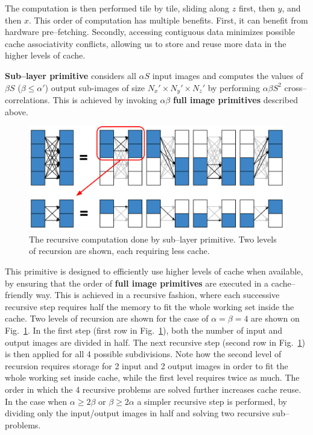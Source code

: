   The computation is then performed tile by tile, sliding along $z$
  first, then $y$, and then $x$.  This order of computation has
  multiple benefits.  First, it can benefit from hardware
  pre--fetching.  Secondly, accessing contiguous data minimizes
  possible cache associativity conflicts, allowing us to store and reuse more
  data in the higher levels of cache.

  {\bf Sub--layer primitive} considers all $\alpha S$ input images and
  computes the values of $\beta S$ ($\beta \le \alpha'$) output
  sub-images of size $N_x' \times N_y' \times N_z'$ by performing
  $\alpha \beta S^2$ cross--correlations.  This is achieved by invoking
  $\alpha \beta$ {\bf full image primitives} described above.

  \begin{figure}
    \begin{center}
      \includegraphics[width=0.8\linewidth]{fig/serialexec}
    \end{center}
    \caption{The recursive computation done by sub--layer primitive.
      Two levels of recursion are shown, each requiring less cache. }
    \label{fig:full-exec}
  \end{figure}

  This primitive is designed to efficiently use higher levels of cache
  when available, by ensuring that the order of {\bf full image
    primitives} are executed in a cache--friendly way.  This is
  achieved in a recursive fashion, where each successive recursive
  step requires half the memory to fit the whole working set inside
  the cache.  Two levels of recursion are shown for the case of
  $\alpha = \beta = 4$ are shown on Fig.~\ref{fig:full-exec}.  In the
  first step (first row in Fig.~\ref{fig:full-exec}), both the number
  of input and output images are divided in half.  The next recursive
  step (second row in Fig.~\ref{fig:full-exec}) is then applied for
  all 4 possible subdivisions.  Note how the second level of recursion
  requires storage for 2 input and 2 output images in order to fit the
  whole working set inside cache, while the first level requires twice
  as much.  The order in which the 4 recursive problems are solved
  further increases cache reuse.  In the case when $\alpha \ge 2\beta$
  or $\beta \ge 2\alpha$ a simpler recursive step is performed, by
  dividing only the input/output images in half and solving two
  recursive sub--problems.

